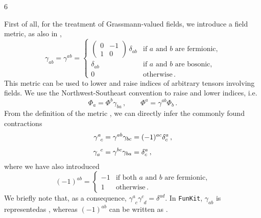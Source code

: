 6\documentclass[10pt,prd,nofootinbib,superscriptaddress,twocolumn]{revtex4-2}
\newcommand{\FunKit}{\texttt{FunKit}\xspace}
\begin{document}
First of all, for the treatment of Grassmann-valued fields, we introduce a field metric, as also in \cite{Pawlowski:2005xe, Braun:2025gvq},
%
\begin{equation}\label{eq:metric}
	\gamma_{ab} = \gamma^{ab} = \begin{cases}
		\begin{pmatrix}
			0 & -1 \\
			1 & 0
		\end{pmatrix}\,\delta_{ab}
		& \text{if $a$ and $b$ are fermionic,} \\[3ex]
		\delta_{ab} & \text{if $a$ and $b$ are bosonic,}   \\[2ex]
		0               & \text{otherwise} 
		\,.
	\end{cases}
\end{equation}
%
This metric can be used to lower and raise indices of arbitrary tensors involving fields. We use the Northwest-Southeast convention to raise and lower indices, i.e.
%
\begin{equation}
	\Phi_a = \Phi^b\gamma_{ba} \,,
	\quad \quad
	\Phi^a = \gamma^{ab}\Phi_b \,.
\end{equation}
%
From the definition of the metric , we can directly infer the commonly found contractions
%
\begin{align}
	\gamma^{a}_{\phantom{a}c} &= \gamma^{ab}\gamma_{bc} = (-1)^{ac}\delta^a_c
	\,,\notag\\[1ex]
	\gamma_{a}^{\phantom{a}c} &= \gamma^{bc}\gamma_{ba} = \delta^a_c
	\,,
\end{align}
%
where we have also introduced
%
\begin{equation}
	(-1)^{ab} = \begin{cases}
		-1 & \text{if both $a$ and $b$ are fermionic,} \\[1ex]
		1 & \text{otherwise} 
		\,.
	\end{cases}
\end{equation}
%
We briefly note that, as a consequence, $\gamma^{a}_{\phantom{a}c}\gamma^{c}_{\phantom{c}d} = \delta^{ad}$.
In \FunKit, $\gamma_{ab}$ is represented\linebreak as , whereas $(-1)^{ab}$ can be written as .
\end{document}
